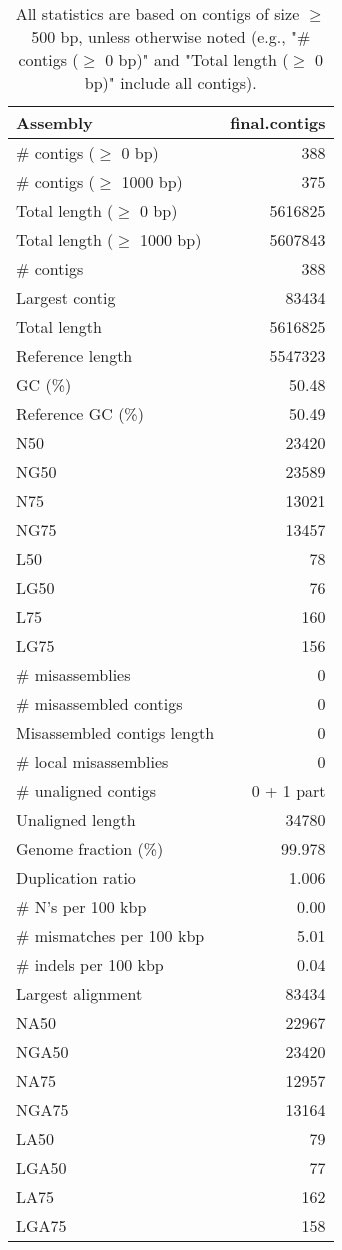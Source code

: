 \documentclass[12pt,a4paper]{article}
\begin{document}
\begin{table}[ht]
\begin{center}
\caption{All statistics are based on contigs of size $\geq$ 500 bp, unless otherwise noted (e.g., "\# contigs ($\geq$ 0 bp)" and "Total length ($\geq$ 0 bp)" include all contigs).}
\begin{tabular}{|l*{1}{|r}|}
\hline
Assembly & final.contigs \\ \hline
\# contigs ($\geq$ 0 bp) & 388 \\ \hline
\# contigs ($\geq$ 1000 bp) & 375 \\ \hline
Total length ($\geq$ 0 bp) & 5616825 \\ \hline
Total length ($\geq$ 1000 bp) & 5607843 \\ \hline
\# contigs & 388 \\ \hline
Largest contig & 83434 \\ \hline
Total length & 5616825 \\ \hline
Reference length & 5547323 \\ \hline
GC (\%) & 50.48 \\ \hline
Reference GC (\%) & 50.49 \\ \hline
N50 & 23420 \\ \hline
NG50 & 23589 \\ \hline
N75 & 13021 \\ \hline
NG75 & 13457 \\ \hline
L50 & 78 \\ \hline
LG50 & 76 \\ \hline
L75 & 160 \\ \hline
LG75 & 156 \\ \hline
\# misassemblies & 0 \\ \hline
\# misassembled contigs & 0 \\ \hline
Misassembled contigs length & 0 \\ \hline
\# local misassemblies & 0 \\ \hline
\# unaligned contigs & 0 + 1 part \\ \hline
Unaligned length & 34780 \\ \hline
Genome fraction (\%) & 99.978 \\ \hline
Duplication ratio & 1.006 \\ \hline
\# N's per 100 kbp & 0.00 \\ \hline
\# mismatches per 100 kbp & 5.01 \\ \hline
\# indels per 100 kbp & 0.04 \\ \hline
Largest alignment & 83434 \\ \hline
NA50 & 22967 \\ \hline
NGA50 & 23420 \\ \hline
NA75 & 12957 \\ \hline
NGA75 & 13164 \\ \hline
LA50 & 79 \\ \hline
LGA50 & 77 \\ \hline
LA75 & 162 \\ \hline
LGA75 & 158 \\ \hline
\end{tabular}
\end{center}
\end{table}
\end{document}
